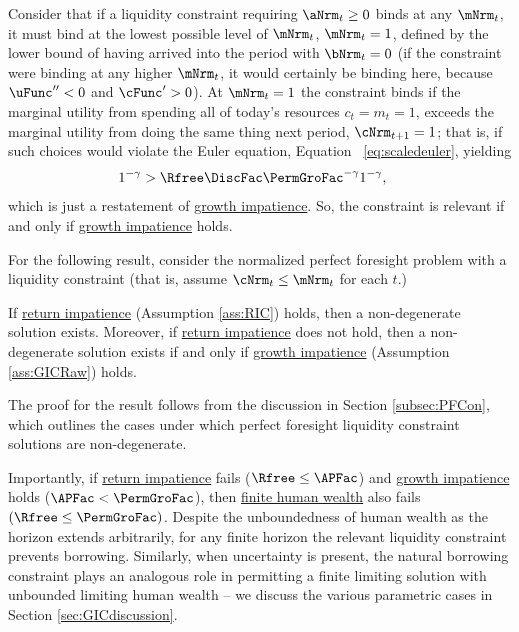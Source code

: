 \documentclass[BufferStockTheory]{subfiles}
\begin{document}
Consider that if a liquidity constraint requiring $\aNrm_{t} \geq 0$ binds at any $\mNrm_{t}$, it must bind at the lowest possible level of $\mNrm_{t}$, $\mNrm_{t}=1$, defined by the lower bound of having arrived into the period with $\bNrm_{t}=0$ (if the constraint were binding at any higher $\mNrm_{t}$, it would certainly be binding here, because $\uFunc^{\prime\prime}<0$ and $\cFunc^{\prime}>0$).
At $\mNrm_{t}=1$ the constraint binds if the marginal utility from spending all of today's resources $c_{t}=m_{t}=1$, exceeds the marginal utility from doing the same thing next period, $\cNrm_{t+1}=1$; that is, if such choices would violate the Euler equation, Equation ~\eqref{eq:scaledeuler}, yielding
\begin{equation}\begin{gathered}\begin{aligned}
  1^{-\CRRA}  & > \Rfree \DiscFac \PermGroFac^{-\CRRA}1^{-\CRRA},  \label{eq:LiqConstrBinds}
\end{aligned}\end{gathered}\end{equation}
which is just a restatement of \hyperlink{GIC}{growth impatience}.
So, the constraint is relevant if and only if \hyperlink{GICRaw}{growth impatience} holds.

For the following result, consider the normalized perfect foresight problem with a liquidity constraint (that is, assume $\cNrm_{t}\leq \mNrm_{t}$ for each $t$.)

\begin{proposition}\label{prop:PFCExist}
 If \hyperlink{RIC}{return impatience} (Assumption \ref{ass:RIC}) holds, then a non-degenerate solution exists. Moreover, if \hyperlink{RIC}{return impatience} does not hold, then a non-degenerate solution exists if and only if \hyperlink{GICRaw}{growth impatience} (Assumption \ref{ass:GICRaw}) holds. 
\end{proposition}

The proof for the result follows from the discussion in Section \ref{subsec:PFCon}, which outlines the cases under which perfect foresight liquidity constraint solutions are non-degenerate.

Importantly, if \hyperlink{RIC}{return impatience} fails ($\Rfree\leq \APFac$) and \hyperlink{GIC}{growth impatience} holds ($\APFac<\PermGroFac$), then \hyperlink{FHWC}{finite human wealth} also fails $(\Rfree \leq \PermGroFac)$.
Despite the unboundedness of human wealth as the horizon extends arbitrarily, for any finite horizon the relevant liquidity constraint prevents borrowing.
Similarly, when uncertainty is present, the natural borrowing constraint plays an analogous role in permitting a finite limiting solution with unbounded limiting human wealth -- we discuss the various parametric cases in Section \ref{sec:GICdiscussion}.
\end{document}
